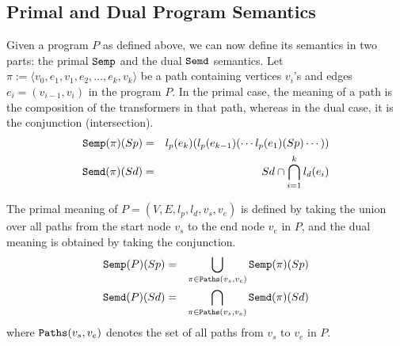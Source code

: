 \documentclass[preprint]{sig-alternate-05-2015}
\def\semp{{\tt{Semp}}}
\def\semd{{\tt{Semd}}}
\def\paths{{\tt{Paths}}}
\begin{document}
\subsection{Primal and Dual Program Semantics}

Given a program $P$ as defined above, we can now define
its semantics in two parts: the primal $\semp$ and the dual $\semd$ semantics. 
Let $\pi := \langle v_0, e_1, v_1, e_2, \ldots, e_{k}, v_k \rangle$ be a path 
containing vertices $v_i$'s and edges $e_i = (v_{i-1},v_i)$ in the program $P$.
In the primal case, the meaning of a path is 
the composition of the transformers in that path, whereas
in the dual case, it is  the conjunction (intersection).
\begin{eqnarray}
  \semp(\pi)(Sp) & = &  l_p(e_k)(l_p(e_{k-1})( \cdots l_p(e_1)(Sp)\cdots)) \\
  \semd(\pi)(Sd) & = &  Sd \cap  \bigcap_{i=1}^{k} l_d(e_i)
\end{eqnarray}
%

The primal meaning of $P = (V,E,l_p,l_d,v_s,v_e)$ is defined by
taking the union over all paths
from the start node $v_s$ to the end node $v_e$ in $P$, and the
dual meaning is obtained by taking the conjunction.
\begin{eqnarray}
 \semp(P)(Sp) & = &
  \bigcup_{\pi\in\paths(v_s,v_e)}
   \semp( \pi )(Sp)
\\
 \semd(P)(Sd) & = &
  \bigcap_{\pi\in\paths(v_s,v_e)}
   \semd( \pi )(Sd)
\end{eqnarray}
where $\paths(v_s,v_e)$ denotes the set of all paths from $v_s$ to $v_e$ in $P$.

\end{document}
